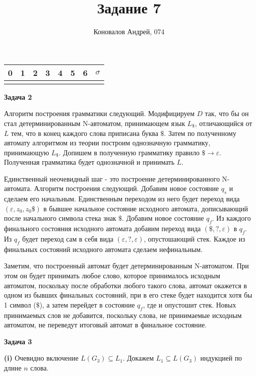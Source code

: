 \documentclass[10pt]{article}
\title{Задание 7}
\author{Коновалов Андрей, 074}
\date{}
\let \eps \varepsilon
\begin{document}
\maketitle

\noindent
\begin{tabularx}{\textwidth}{|C|C|C|C|C|C|C|C|}
   & 1 & 2 & 3 & 4 & 5 & 6 & $\sigma$ \\
  \hline
  &&&&&&& \\
  \hline
\end{tabularx}

\bigskip

{\bf Задача 2}

Алгоритм построения грамматики следующий. Модифицируем $D$ так, что бы он стал детерминированным N-автоматом, принимающем язык $L_{\$}$, отличающийся от $L$ тем, что в конец каждого слова приписана буква $\$$. Затем по полученному автомату алгоритмом из теории построим однозначную грамматику, принимающую $L_{\$}$. Допишем в полученную грамматику правило $\$ \rightarrow \eps$. Полученная грамматика будет однозначной и принимать $L$.

Единственный неочевидный шаг - это построение детерминированного N-автомата. Алгоритм построения следующий. Добавим новое состояние $q_s$ и сделаем его начальным. Единственным переходом из него будет переход вида $(\eps, z_0, z_0 \$)$ в бывшее начальное состояние исходного автомата, дописывающий после начального символа стека знак $\$$. Добавим новое состояние $q_f$. Из каждого финального состояния исходного автомата добавим переход вида $(\$, ?, \eps)$ в $q_f$. Из $q_f$ будет переход сам в себя вида $(\eps, ?, \eps)$, опустошающий стек. Каждое из финальных состояний исходного автомата сделаем нефинальным.

Заметим, что построенный автомат будет детерминированным N-автоматом. При этом он будет принимать любое слово, которое принималось исходным автоматом, поскольку после обработки любого такого слова, автомат окажется в одном из бывших финальных состояний, при в его стеке будет находится хотя бы 1 символ ($\$$), а затем перейдет в состояние $q_f$, где и опустошит стек. Новых принимаемых слов не добавится, поскольку слова, не принимаемые исходным автоматом, не переведут итоговый автомат в финальное состояние.

\medskip

{\bf Задача 3}

{\bf (i)}
Очевидно включение $L(G_3) \subseteq L_1$. Докажем $L_1 \subseteq L(G_3)$ индукцией по длине $n$ слова.
\end{document}

